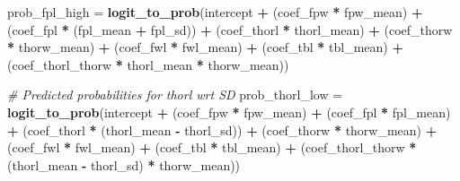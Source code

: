 \documentclass[
]{article}
\newenvironment{Shaded}{\begin{snugshade}}{\end{snugshade}}
\newcommand{\CommentTok}[1]{\textcolor[rgb]{0.56,0.35,0.01}{\textit{#1}}}
\newcommand{\FunctionTok}[1]{\textcolor[rgb]{0.13,0.29,0.53}{\textbf{#1}}}
\newcommand{\NormalTok}[1]{#1}
\newcommand{\OtherTok}[1]{\textcolor[rgb]{0.56,0.35,0.01}{#1}}
\newcommand{\SpecialCharTok}[1]{\textcolor[rgb]{0.81,0.36,0.00}{\textbf{#1}}}
\begin{document}
\begin{Shaded}
\begin{Highlighting}[]
\NormalTok{prob\_fpl\_high }\OtherTok{=} \FunctionTok{logit\_to\_prob}\NormalTok{(intercept }\SpecialCharTok{+} 
\NormalTok{                                (coef\_fpw }\SpecialCharTok{*}\NormalTok{ fpw\_mean) }\SpecialCharTok{+} 
\NormalTok{                                (coef\_fpl }\SpecialCharTok{*}\NormalTok{ (fpl\_mean }\SpecialCharTok{+}\NormalTok{ fpl\_sd)) }\SpecialCharTok{+} 
\NormalTok{                                (coef\_thorl }\SpecialCharTok{*}\NormalTok{ thorl\_mean) }\SpecialCharTok{+} 
\NormalTok{                                (coef\_thorw }\SpecialCharTok{*}\NormalTok{ thorw\_mean) }\SpecialCharTok{+} 
\NormalTok{                                (coef\_fwl }\SpecialCharTok{*}\NormalTok{ fwl\_mean) }\SpecialCharTok{+} 
\NormalTok{                                (coef\_tbl }\SpecialCharTok{*}\NormalTok{ tbl\_mean) }\SpecialCharTok{+} 
\NormalTok{                                (coef\_thorl\_thorw }\SpecialCharTok{*}\NormalTok{ thorl\_mean }\SpecialCharTok{*}\NormalTok{ thorw\_mean))}

\CommentTok{\# Predicted probabilities for thorl wrt SD}
\NormalTok{prob\_thorl\_low }\OtherTok{=} \FunctionTok{logit\_to\_prob}\NormalTok{(intercept }\SpecialCharTok{+} 
\NormalTok{                                (coef\_fpw }\SpecialCharTok{*}\NormalTok{ fpw\_mean) }\SpecialCharTok{+} 
\NormalTok{                                (coef\_fpl }\SpecialCharTok{*}\NormalTok{ fpl\_mean) }\SpecialCharTok{+} 
\NormalTok{                                (coef\_thorl }\SpecialCharTok{*}\NormalTok{ (thorl\_mean }\SpecialCharTok{{-}}\NormalTok{ thorl\_sd)) }\SpecialCharTok{+} 
\NormalTok{                                (coef\_thorw }\SpecialCharTok{*}\NormalTok{ thorw\_mean) }\SpecialCharTok{+} 
\NormalTok{                                (coef\_fwl }\SpecialCharTok{*}\NormalTok{ fwl\_mean) }\SpecialCharTok{+} 
\NormalTok{                                (coef\_tbl }\SpecialCharTok{*}\NormalTok{ tbl\_mean) }\SpecialCharTok{+} 
\NormalTok{                                (coef\_thorl\_thorw }\SpecialCharTok{*}\NormalTok{ (thorl\_mean }\SpecialCharTok{{-}}\NormalTok{ thorl\_sd) }\SpecialCharTok{*}\NormalTok{ thorw\_mean))}


\end{Highlighting}
\end{Shaded}
\end{document}
